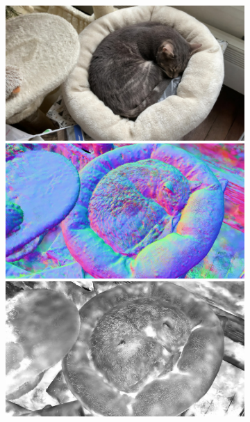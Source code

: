 \begin{figure}[tb]
\begin{subfigure}{0.155\linewidth}
  \includegraphics[width=\linewidth]{images/renders/sirius1_rgb_52bis.jpg}
  \includegraphics[width=\linewidth]{images/normals/sirius1_normals_52_bis.jpg}
  \includegraphics[width=\linewidth]{images/frosting_size/sirius1_size_52_ter.jpg}
  \end{subfigure}
  \hfill
  \begin{subfigure}{0.155\linewidth}

\end{subfigure}
\end{figure}
